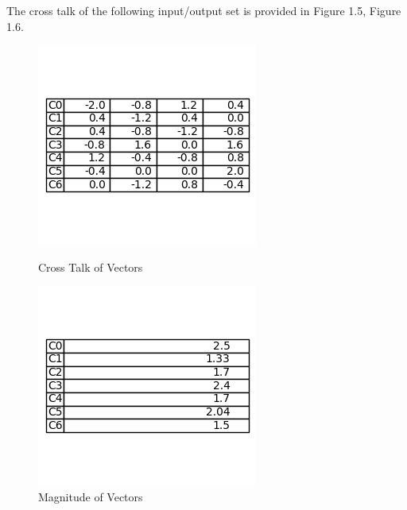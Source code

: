 \documentclass[12pt]{article}
\begin{document}
The cross talk of the following input/output set is provided in Figure 1.5, Figure 1.6. 

\begin{figure}[ht]
    \centering
    \begin{minipage}{0.3\textwidth}
        \centering
        \includegraphics[width=\linewidth]{CrossTalk3.png}
        \vspace{-2cm}
        \caption{Cross Talk of Vectors}
        \label{fig:crosstalk}
    \end{minipage}\hfill
    \begin{minipage}{0.3\textwidth}
        \centering
        \includegraphics[width=\linewidth]{magnitude3.png}
        \vspace{-2cm}
        \caption{Magnitude of Vectors}
        \label{fig:magnitude}
    \end{minipage}
\end{figure}
\end{document}
